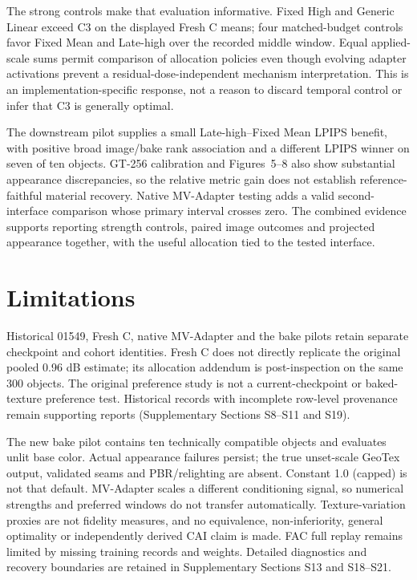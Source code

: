 \documentclass[times,twocolumn,final]{elsarticle}
\begin{document}
The strong controls make that evaluation informative. Fixed High and Generic Linear exceed C3 on the displayed Fresh C means; four matched-budget controls favor Fixed Mean and Late-high over the recorded middle window. Equal applied-scale sums permit comparison of allocation policies even though evolving adapter activations prevent a residual-dose-independent mechanism interpretation. This is an implementation-specific response, not a reason to discard temporal control or infer that C3 is generally optimal.

The downstream pilot supplies a small Late-high--Fixed Mean LPIPS benefit, with positive broad image/bake rank association and a different LPIPS winner on seven of ten objects. GT-256 calibration and Figures~5--8 also show substantial appearance discrepancies, so the relative metric gain does not establish reference-faithful material recovery. Native MV-Adapter testing adds a valid second-interface comparison whose primary interval crosses zero. The combined evidence supports reporting strength controls, paired image outcomes and projected appearance together, with the useful allocation tied to the tested interface.

\section{Limitations}
\label{sec:limitations}
Historical 01549, Fresh C, native MV-Adapter and the bake pilots retain separate checkpoint and cohort identities. Fresh C does not directly replicate the original pooled 0.96 dB estimate; its allocation addendum is post-inspection on the same 300 objects. The original preference study is not a current-checkpoint or baked-texture preference test. Historical records with incomplete row-level provenance remain supporting reports (Supplementary Sections S8--S11 and S19).

The new bake pilot contains ten technically compatible objects and evaluates unlit base color. Actual appearance failures persist; the true unset-scale GeoTex output, validated seams and PBR/relighting are absent. Constant 1.0 (capped) is not that default. MV-Adapter scales a different conditioning signal, so numerical strengths and preferred windows do not transfer automatically. Texture-variation proxies are not fidelity measures, and no equivalence, non-inferiority, general optimality or independently derived CAI claim is made. FAC full replay remains limited by missing training records and weights. Detailed diagnostics and recovery boundaries are retained in Supplementary Sections S13 and S18--S21.
\end{document}
